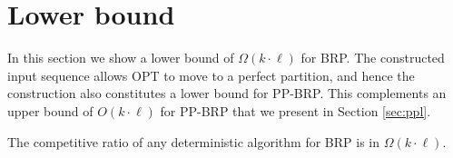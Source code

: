 \documentclass[manuscript,screen=true]{acmart}
\newcommand{\OBRP}{BRP}
\newcommand{\PPOBRP}{PP-BRP}
\begin{document}
\section{Lower bound} %
\label{sec:lowerbound}

In this section we show a lower bound of $\Omega(k \cdot \ell)$ for \OBRP{}.
The constructed input sequence allows OPT to move to a perfect partition, and hence
the construction also constitutes a lower bound for \PPOBRP{}.
This complements an upper bound of $O(k \cdot \ell)$
for \PPOBRP{} that we present in Section \ref{sec:ppl}.

\begin{theorem}
	The competitive ratio of any deterministic algorithm for \OBRP{} is in $\Omega(k\cdot \ell)$.
\end{theorem}
\end{document}
